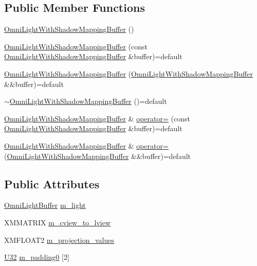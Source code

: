 \subsection*{Public Member Functions}
\begin{DoxyCompactItemize}
\item 
\hyperlink{structmage_1_1_omni_light_with_shadow_mapping_buffer_a02ade96988185cc3b0f24f4618534935}{Omni\+Light\+With\+Shadow\+Mapping\+Buffer} ()
\item 
\hyperlink{structmage_1_1_omni_light_with_shadow_mapping_buffer_a6aabe633e5b81842a7686561c8af30fc}{Omni\+Light\+With\+Shadow\+Mapping\+Buffer} (const \hyperlink{structmage_1_1_omni_light_with_shadow_mapping_buffer}{Omni\+Light\+With\+Shadow\+Mapping\+Buffer} \&buffer)=default
\item 
\hyperlink{structmage_1_1_omni_light_with_shadow_mapping_buffer_afb66f7933b73e60c234dc89e3033271a}{Omni\+Light\+With\+Shadow\+Mapping\+Buffer} (\hyperlink{structmage_1_1_omni_light_with_shadow_mapping_buffer}{Omni\+Light\+With\+Shadow\+Mapping\+Buffer} \&\&buffer)=default
\item 
\hyperlink{structmage_1_1_omni_light_with_shadow_mapping_buffer_ac28ea25ecb8f27be2403c37a16fd9631}{$\sim$\+Omni\+Light\+With\+Shadow\+Mapping\+Buffer} ()=default
\item 
\hyperlink{structmage_1_1_omni_light_with_shadow_mapping_buffer}{Omni\+Light\+With\+Shadow\+Mapping\+Buffer} \& \hyperlink{structmage_1_1_omni_light_with_shadow_mapping_buffer_ab94e93f02ca982d85be2bd8da2714c01}{operator=} (const \hyperlink{structmage_1_1_omni_light_with_shadow_mapping_buffer}{Omni\+Light\+With\+Shadow\+Mapping\+Buffer} \&buffer)=default
\item 
\hyperlink{structmage_1_1_omni_light_with_shadow_mapping_buffer}{Omni\+Light\+With\+Shadow\+Mapping\+Buffer} \& \hyperlink{structmage_1_1_omni_light_with_shadow_mapping_buffer_ad7801e067fde2f54f0c328b2e34ed118}{operator=} (\hyperlink{structmage_1_1_omni_light_with_shadow_mapping_buffer}{Omni\+Light\+With\+Shadow\+Mapping\+Buffer} \&\&buffer)=default
\end{DoxyCompactItemize}
\subsection*{Public Attributes}
\begin{DoxyCompactItemize}
\item 
\hyperlink{structmage_1_1_omni_light_buffer}{Omni\+Light\+Buffer} \hyperlink{structmage_1_1_omni_light_with_shadow_mapping_buffer_ad04cdb09bc31de362f8f4f75aa5b6aea}{m\+\_\+light}
\item 
X\+M\+M\+A\+T\+R\+IX \hyperlink{structmage_1_1_omni_light_with_shadow_mapping_buffer_ac8818649198198519826adf18fe0da7d}{m\+\_\+cview\+\_\+to\+\_\+lview}
\item 
X\+M\+F\+L\+O\+A\+T2 \hyperlink{structmage_1_1_omni_light_with_shadow_mapping_buffer_afd75d76a4713da8430e0c0080602e0b7}{m\+\_\+projection\+\_\+values}
\item 
\hyperlink{namespacemage_a41c104c036fba3756a74e19f793eeaa1}{U32} \hyperlink{structmage_1_1_omni_light_with_shadow_mapping_buffer_aaaf8cc62c3bb6607d2efb6c0b5069f87}{m\+\_\+padding0} \mbox{[}2\mbox{]}
\end{DoxyCompactItemize}
